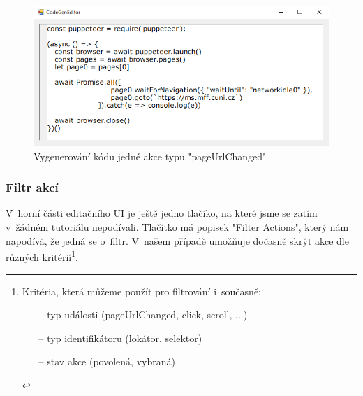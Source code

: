 \documentclass[12pt, a4paper, twoside]{article}
\begin{document}
	\begin{figure}[H]\ContinuedFloat
		\centering
		\includegraphics[width=1.0\textwidth]{pageUrlChangedCodeGen.png}
		\caption{Vygenerování kódu jedné akce typu "pageUrlChanged"}
	\end{figure}
	\subsubsection{Filtr akcí}
	V~horní části editačního UI je ještě jedno tlačíko, na které jsme se zatím v~žádném tutoriálu nepodívali. Tlačítko má popisek "Filter Actions", který nám napodívá, že jedná se o~filtr. V~našem případě umožňuje dočasně skrýt akce dle různých kritérií\footnote{Kritéria, která můžeme použít pro filtrování i~současně:
		\begin{itemize}[noitemsep, topsep=1pt]
			\item[--] typ události (pageUrlChanged, click, scroll, ...)
			\item[--] typ identifikátoru (lokátor, selektor)
			\item[--] stav akce (povolená, vybraná)
		\end{itemize} 
	}.
\end{document}
